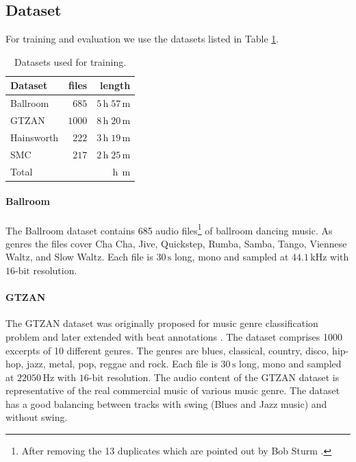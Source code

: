 \documentclass{scrartcl}
\begin{document}
\subsection{Dataset}
For training and evaluation we use the datasets listed in Table \ref{tab:datasets}.
\begin{table}[htbp]
\caption{Datasets used for training.}
\label{tab:datasets}
\centering
\begin{tabular}{lrr}
\hline
\hline
\textbf{Dataset} & \textbf{files} & \textbf{length} \\
\hline
Ballroom \cite{Gouyon2006b, Krebs2013} & $685$ & $5\,\text{h} \;57\,\text{m}$\\
GTZAN \cite{Tzanetakis2002b, marchand2015swing} & $1000$ & $8\,\text{h}\;20\,\text{m}$\\
Hainsworth \cite{Hainsworth2004} & $222$ & $3\,\text{h}\;19\,\text{m}$\\
SMC \cite{Holzapfel2012} & $217$ & $2\,\text{h}\;25\,\text{m}$\\    
\hline
Total & $ $ & $ \,\text{h}\; \,\text{m}$\\  
\hline
\hline
\end{tabular}
\end{table}  

\paragraph{Ballroom} 
The Ballroom dataset \cite{Gouyon2006b, Krebs2013} contains 685 audio files\footnote{After removing the 13 duplicates which are pointed out by Bob Sturm \cite{Sturm2014}.} of ballroom dancing music. As genres the files cover Cha Cha, Jive, Quickstep, Rumba, Samba, Tango, Viennese Waltz, and Slow Waltz. Each file is $30\,\text{s}$ long, mono and sampled at $44.1\,\text{kHz}$ with $16\text{-bit}$ resolution.

\paragraph{GTZAN} 
The GTZAN \cite{Tzanetakis2002b} dataset was originally proposed for music genre classification problem and later extended with beat annotations \cite{marchand2015swing}. The dataset comprises 1000 excerpts of 10 different genres. The genres are blues, classical, country, disco, hip-hop, jazz, metal, pop, reggae and rock. Each file is $30\,\text{s}$ long, mono and sampled at $22050\,\text{Hz}$ with $16\text{-bit}$ resolution. The audio content of the GTZAN dataset is representative of the real commercial music of various music genre. The dataset has a good balancing between tracks with swing (Blues and Jazz music) and without swing.
\end{document}
